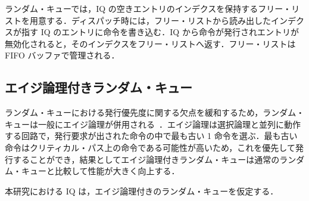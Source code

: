 ランダム・キューでは，IQ の空きエントリのインデクスを保持するフリー・リストを用意する．ディスパッチ時には，フリー・リストから読み出したインデクスが指す IQ のエントリに命令を書き込む．IQ から命令が発行されエントリが無効化されると，そのインデクスをフリー・リストへ返す．フリー・リストは FIFO バッファで管理される．

\subsection{エイジ論理付きランダム・キュー}
ランダム・キューにおける発行優先度に関する欠点を緩和するため，ランダム・キューは一般にエイジ論理が併用される~\cite{Alpha21464}．エイジ論理は選択論理と並列に動作する回路で，発行要求が出された命令の中で最も古い 1 命令を選ぶ．最も古い命令はクリティカル・パス上の命令である可能性が高いため，これを優先して発行することができ，結果としてエイジ論理付きランダム・キューは通常のランダム・キューと比較して性能が大きく向上する．

本研究における IQ は，エイジ論理付きのランダム・キューを仮定する．

